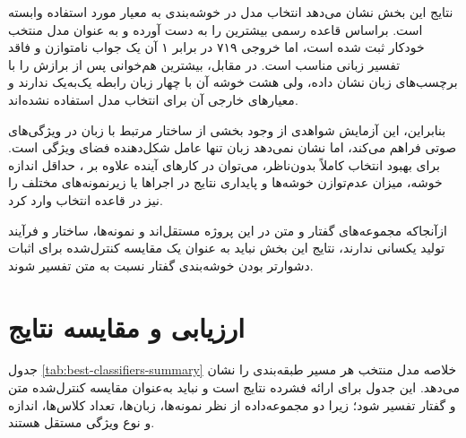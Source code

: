 \documentclass[12pt,a4paper,oneside]{report}
\begin{document}
نتایج این بخش نشان می‌دهد انتخاب مدل در خوشه‌بندی به معیار مورد استفاده
وابسته است.  براساس قاعده رسمی بیشترین
 را به دست آورده و به عنوان مدل منتخب خودکار ثبت شده است،
اما خروجی ۷۱۹ در برابر ۱ آن یک جواب نامتوازن و فاقد تفسیر زبانی مناسب است.
در مقابل،  بیشترین هم‌خوانی پس از برازش را با برچسب‌های زبان
نشان داده، ولی هشت خوشه آن با چهار زبان رابطه یک‌به‌یک ندارند و معیارهای
خارجی آن برای انتخاب مدل استفاده نشده‌اند.

بنابراین، این آزمایش شواهدی از وجود بخشی از ساختار مرتبط با زبان در
ویژگی‌های صوتی فراهم می‌کند، اما نشان نمی‌دهد زبان تنها عامل شکل‌دهنده
فضای ویژگی است. برای بهبود انتخاب کاملاً بدون‌ناظر، می‌توان در کارهای آینده
علاوه بر ، حداقل اندازه خوشه، میزان عدم‌توازن خوشه‌ها و
پایداری نتایج در اجراها یا زیرنمونه‌های مختلف را نیز در قاعده انتخاب وارد
کرد.

ازآنجاکه مجموعه‌های گفتار و متن در این پروژه مستقل‌اند و نمونه‌ها، ساختار
و فرآیند تولید یکسانی ندارند، نتایج این بخش نباید به عنوان یک مقایسه
کنترل‌شده برای اثبات دشوارتر بودن خوشه‌بندی گفتار نسبت به متن تفسیر شوند.

\section{ارزیابی و مقایسه نتایج}

جدول
\ref{tab:best-classifiers-summary}
خلاصه مدل منتخب هر مسیر طبقه‌بندی را نشان می‌دهد. این جدول برای ارائه فشرده نتایج است و نباید به‌عنوان مقایسه کنترل‌شده متن و گفتار تفسیر شود؛ زیرا دو مجموعه‌داده از نظر نمونه‌ها، زبان‌ها، تعداد کلاس‌ها، اندازه و نوع ویژگی مستقل هستند.

\begin{table}[H]
\centering
\caption{خلاصه طبقه‌بند منتخب در هر مجموعه‌داده مستقل}
\label{tab:best-classifiers-summary}
\small
{}
\end{table}
\end{document}
